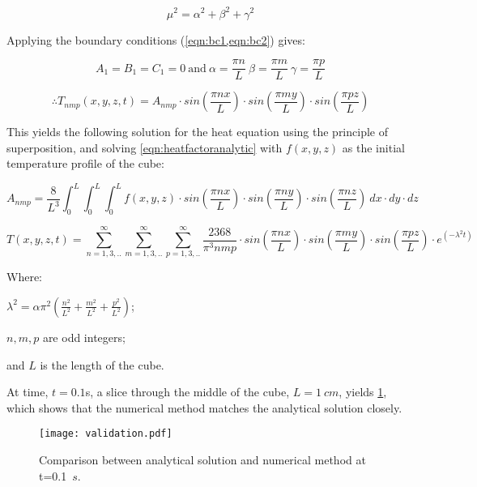 \begin{equation}
\mu^2=\alpha^2+\beta^2+\gamma^2
\end{equation}

Applying the boundary conditions (\cref{eqn:bc1,eqn:bc2}) gives:

\begin{equation}
A_1=B_1=C_1=0\
\text{and}\ \alpha=\frac{\pi n}{L}\ \beta=\frac{\pi m}{L}\ \gamma=\frac{\pi p}{L}
\end{equation}

\begin{equation}
\therefore  T_{nmp}(x,y,z,t)=A_{nmp}\cdot sin\left(\frac{\pi n x}{L}\right)\cdot sin\left(\frac{\pi m y}{L}\right)\cdot sin\left(\frac{\pi p z}{L}\right)
\end{equation}

This yields the following solution for the heat equation using the principle of superposition, and solving \cref{eqn:heatfactoranalytic} with $f(x,y,z)$ as the initial temperature profile of the cube:

\begin{equation}
A_{nmp}=\frac{8}{L^3}\int_0^L\int_0^L\int_0^L f(x,y,z)\cdot sin(\frac{\pi n x}{L})\cdot sin(\frac{\pi n y}{L})\cdot sin(\frac{\pi n z}{L})\ dx\cdot dy\cdot dz
\label{eqn:heatfactoranalytic}
\end{equation}

\begin{equation}
T(x,y,z,t)=\sum^\infty_{n=1,3,..}\sum^\infty_{m=1,3,..}\sum^\infty_{p=1,3,..}\frac{2368}{\pi^3nmp}\cdot sin(\frac{\pi n x}{L})\cdot sin(\frac{\pi m y}{L})\cdot sin(\frac{\pi p z}{L})\cdot e^{(-\lambda^2t)}
\end{equation}

\noindent Where:

	\indent $\lambda^2=\alpha\pi^2(\tfrac{n^2}{L^2}+\tfrac{m^2}{L^2}+\tfrac{p^2}{L^2})$;
	
	\indent $n,m,p$ are odd integers;
	
	\indent and $L$ is the length of the cube.
	
	\medskip
	
At time, $t=0.1$s, a slice through the middle of the cube, $L=1~cm$,  yields \cref{fig:validation-heat}, which shows that the numerical method matches the analytical solution closely.

\begin{figure}	
\vspace{-10pt}
	\centering
	\texttt{[image: validation.pdf]}
	\caption{Comparison between analytical solution and numerical method at t=0.1~$s$.}
	\label{fig:validation-heat}
	\vspace{-10pt}
\end{figure}	

